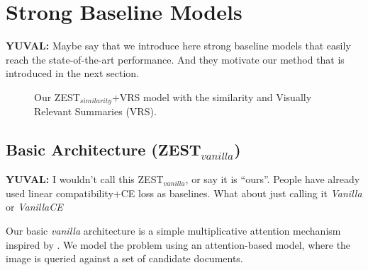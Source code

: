 \documentclass[11pt,a4paper]{article}
\newcommand\yuval[1]{\textcolor{darkpink}{\textbf{YUVAL:} #1 }}
\begin{document}

\section{Strong Baseline Models}
\label{task}

\yuval{Maybe say that we introduce here strong baseline models that easily reach the state-of-the-art performance. And they motivate our method that is introduced in the next section.}


\begin{figure}[th]
\centering
{}
 \caption{Our ZEST$_{similarity}$+VRS model with the similarity and Visually Relevant Summaries (VRS).}
\label{fig:model}
\end{figure}
\subsection{Basic Architecture (ZEST$_{vanilla}$)}
\yuval{I wouldn't call this ZEST$_{vanilla}$, or say it is ``ours''. People have already used linear compatibility+CE loss as baselines. What about just calling it \textit{Vanilla} or \textit{VanillaCE}}

Our basic {\em vanilla} architecture is a simple multiplicative attention mechanism \cite{luong2015effective} inspired by \citet{romera2015embarrassingly}. We model the problem using an attention-based model, where the image is queried
against a set of candidate documents.



\end{document}
